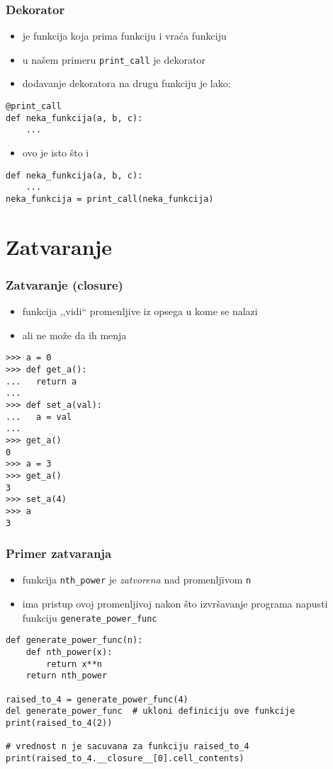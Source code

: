 \documentclass[utf8,compress,aspectratio=169]{beamer}
\begin{document}
\begin{frame}[fragile]
  \frametitle{Dekorator}
  \begin{itemize}
    \item {} je funkcija koja prima funkciju i vraća funkciju
    \item u našem primeru \texttt{print\_call} je dekorator
    \item dodavanje dekoratora na drugu funkciju je lako:
  \end{itemize}
\begin{verbatim}
@print_call
def neka_funkcija(a, b, c):
    ...
\end{verbatim}
  \begin{itemize}
    \item ovo je isto što i
  \end{itemize}
\begin{verbatim}
def neka_funkcija(a, b, c):
    ...
neka_funkcija = print_call(neka_funkcija)
\end{verbatim}
\end{frame}

\section[Closure]{Zatvaranje}

\begin{frame}[fragile,shrink=10]
  \frametitle{Zatvaranje (closure)}
  \begin{itemize}
    \item funkcija ,,vidi`` promenljive iz opsega u kome se nalazi
    \item ali ne može da ih menja
    \end{itemize}
\begin{verbatim}
>>> a = 0
>>> def get_a():
...   return a
...
>>> def set_a(val):
...   a = val
...
>>> get_a()
0
>>> a = 3
>>> get_a()
3
>>> set_a(4)
>>> a
3
\end{verbatim}
\end{frame}

\begin{frame}[fragile]
  \frametitle{Primer zatvaranja}
  \begin{itemize}
    \item funkcija \texttt{nth\_power} je \textit{zatvorena} nad promenljivom \texttt{n}
    \item ima pristup ovoj promenljivoj nakon što izvršavanje programa napusti funkciju \texttt{generate\_power\_func}
    \end{itemize}
\begin{verbatim}
def generate_power_func(n):
    def nth_power(x):
        return x**n
    return nth_power

raised_to_4 = generate_power_func(4)
del generate_power_func  # ukloni definiciju ove funkcije
print(raised_to_4(2))

# vrednost n je sacuvana za funkciju raised_to_4
print(raised_to_4.__closure__[0].cell_contents)
\end{verbatim}
\end{frame}
\end{document}
